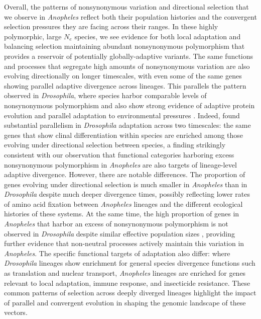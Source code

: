 Overall, the patterns of nonsynonymous variation and directional selection that we observe
in \textit{Anopheles} reflect both their population histories and the convergent selection
pressures they are facing across their ranges. In these highly polymorphic,
large $N_e$ species, we see evidence for both local adaptation and balancing selection
maintaining abundant nonsynonymous polymorphism that provides a reservoir of
potentially globally-adaptive variants. The same functions and processes
that segregate high amounts of nonsynonymous variation are also evolving directionally on
longer timescales, with even some of the same genes showing
parallel adaptive divergence across lineages.
This parallels the pattern observed in \textit{Drosophila}, where
species harbor comparable levels of nonsynonymous polymorphism and
also show strong evidence of adaptive protein evolution and
parallel adaptation to environmental pressures \citep{drosophila, Zhao_Wit_Svetec_Begun_2015}.
Indeed, \citet{Zhao_Begun_2017} found substantial parallelism
in \textit{Drosophila} adaptation across two timescales:
the same genes that show clinal differentiation within species
are enriched among those evolving under directional selection between species,
a finding strikingly consistent with our observation that
functional categories harboring excess nonsynonymous polymorphism in \textit{Anopheles}
are also targets of lineage-level adaptive divergence.
However, there are notable differences.
The proportion of genes evolving under directional
selection is much smaller in \textit{Anopheles} than in \textit{Drosophila} despite
much deeper divergence times,
possibly reflecting lower rates of amino acid fixation between \textit{Anopheles} lineages
and the different ecological histories of these systems.
At the same time, the high proportion of genes in \textit{Anopheles}
that harbor an excess of nonsynonymous polymorphism
is not observed in \textit{Drosophila} despite similar effective population sizes \citep{drosophila},
providing further evidence that non-neutral processes actively maintain
this variation in \textit{Anopheles}.
The specific functional targets of adaptation also differ:
where \textit{Drosophila} lineages show enrichment for
general species divergence functions such as translation and nuclear transport,
\textit{Anopheles} lineages are enriched for genes relevant to
local adaptation, immune response, and insecticide resistance.
These common patterns of selection across deeply diverged lineages highlight
the impact of parallel and convergent evolution in shaping the genomic landscape of these vectors.

